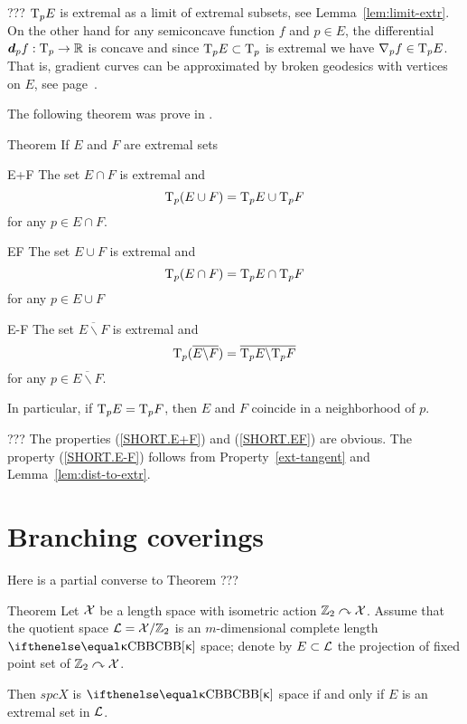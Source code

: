 ???
$\text{\rm T}_p E$ is extremal as a limit of extremal subsets, see
Lemma~\ref{lem:limit-extr}. 
On the other hand for any semiconcave function $f$ and $p\in E$, the differential $\d_p f:\T_p\to\RR$ is concave and since $\T_p E\subset \T_p$ is extremal we have $\nabla_p f\in \T_p E$. 
That is, gradient curves can be approximated by broken
geodesics with vertices on $E$, see page~\pageref{grad-constr}.
\qeds

The following theorem was prove in \cite[3.4--5]{perelman-petrunin:extremal}.

\begin{thm}{Theorem} 
If $E$ and $F$ are extremal sets 
\begin{subthm}{E+F} The set $E\cap F$ is extremal 
and 
\[\T_p(E\cup F)=\T_p E\cup \T_p F\]
for any $p\in E\cap F$.
\end{subthm}

\begin{subthm}{EF} The set $E\cup F$  is extremal
and 
\[\T_p(E\cap F)=\T_p E\cap \T_p F\]
for any $p\in E\cup F$
\end{subthm}

\begin{subthm}{E-F} The set $\overline{E\backslash F}$ is extremal 
and 
\[\text{\rm T}_p(\overline{E\backslash
F})=\overline{\text{\rm T}_p E\backslash \text{\rm T}_p F}\]
for any $p\in \overline{E\backslash F}$.
\end{subthm}

In particular, if $\text{\rm T}_p E=\text{\rm T}_p F$, then $E$ and $F$ coincide in a neighborhood of $p$.
\end{thm}

???
 The properties (\ref{SHORT.E+F}) and (\ref{SHORT.EF}) are obvious. 
The property (\ref{SHORT.E-F}) follows from
Property~\ref{ext-tangent} and Lemma~\ref{lem:dist-to-extr}.
\qeds

\section{Branching coverings}

Here is a partial converse to Theorem ???

\begin{thm}{Theorem}
Let $\mathcal{X}$ be a length space with isometric action $\mathbb{Z}_2\curvearrowright\mathcal{X}$.
Assume that the quotient space $\mathcal{L}=\mathcal{X}/\mathbb{Z}_2$
 is an $m$-dimensional complete length $\Alex\kappa$ space; denote by $E\subset \spc{L}$ the projection of fixed point set of $\mathbb{Z}_2\curvearrowright\mathcal{X}$.

Then $spc{X}$ is $\Alex\kappa$ space if and only if $E$ is an extremal set in $\mathcal{L}$.
\end{thm}



